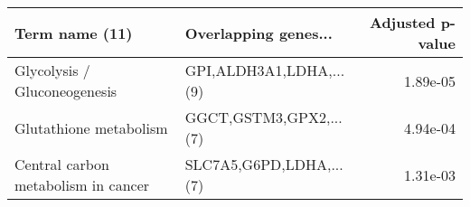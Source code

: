 \begin{tabular}{llr}
\toprule
                     Term name (11) &    Overlapping genes... &  Adjusted p-value \\
\midrule
       Glycolysis / Gluconeogenesis & GPI,ALDH3A1,LDHA,...(9) &          1.89e-05 \\
             Glutathione metabolism &  GGCT,GSTM3,GPX2,...(7) &          4.94e-04 \\
Central carbon metabolism in cancer & SLC7A5,G6PD,LDHA,...(7) &          1.31e-03 \\
\bottomrule
\end{tabular}
